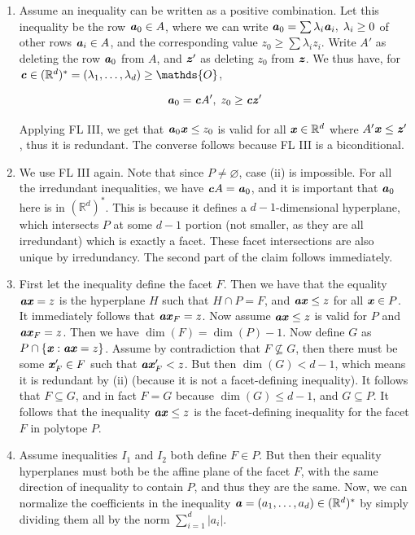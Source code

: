 \documentclass{article}
\begin{document}
\begin{enumerate}
\begin{solution}
\begin{enumerate}[label=(\roman*)]
    \item Assume an inequality can be written as a positive combination. Let this inequality be the row $\textbf{\textit{a}}_0 \in A$, where we can write $\textbf{\textit{a}}_0 = \sum \lambda_i\textbf{\textit{a}}_i, \; \lambda_i \geq 0$ of other rows $\textbf{\textit{a}}_i \in A$, and the corresponding value $z_0 \geq \sum\lambda_i z_i$. Write $A'$ as deleting the row $\textbf{\textit{a}}_0$ from $A$, and $\textbf{\textit{z}}'$ as deleting $z_0$ from $\textbf{\textit{z}}$. We thus have, for $\bi{c} \in (\mathbb{R}^d)^* = (\lambda_1, \ldots, \lambda_d) \geq \mathds{O}$,

    \[\textbf{\textit{a}}_0 = \textbf{\textit{c}}A', \; z_0 \geq \textbf{\textit{cz}}'\]

    Applying FL III, we get that $\textbf{\textit{a}}_0\textbf{\textit{x}} \leq z_0$ is valid for all $\textbf{\textit{x}} \in \mathbb{R}^d$ where $A'\textbf{\textit{x}} \leq \textbf{\textit{z}}'$, thus it is redundant. The converse follows because FL III is a biconditional.

    \item We use FL III again. Note that since $P \neq \varnothing$, case (ii) is impossible. For all the irredundant inequalities, we have $\textbf{\textit{c}}A = \textbf{\textit{a}}_0$, and it is important that $\textbf{\textit{a}}_0$ here is in $(\mathbb{R}^d)^*$. This is because it defines a $d-1$-dimensional hyperplane, which intersects $P$ at some $d-1$ portion (not smaller, as they are all irredundant) which is exactly a facet. These facet intersections are also unique by irredundancy. The second part of the claim follows immediately.

    \item First let the inequality define the facet $F$. Then we have that the equality $\textbf{\textit{ax}}= z$ is the hyperplane $H$ such that $H \cap P = F$, and $\textbf{\textit{ax}} \leq z$ for all $\textbf{\textit{x}} \in P$. It immediately follows that $\textbf{\textit{ax}}_F = z$. Now assume $\textbf{\textit{ax}} \leq z$ is valid for $P$ and $\textbf{\textit{ax}}_F = z$. Then we have $\dim(F) = \dim(P) - 1$. Now define $G$ as $ P \cap \{\textbf{\textit{x}}: \textbf{\textit{ax}} = z\}$. Assume by contradiction that $F \not \subseteq G$, then there must be some $\textbf{\textit{x}}_F' \in F$ such that $\textbf{\textit{ax}}_F' < z$. But then $\dim(G) < d-1$, which means it is redundant by (ii) (because it is not a facet-defining inequality). It follows that $F \subseteq G$, and in fact $F = G$ because $\dim(G) \leq d-1$, and $G \subseteq P$. It follows that the inequality $\textbf{\textit{ax}} \leq z$ is the facet-defining inequality for the facet $F$ in polytope $P$.
    
    \item Assume inequalities $I_1$ and $I_2$ both define $F \in P$. But then their equality hyperplanes must both be the affine plane of the facet $F$, with the same direction of inequality to contain $P$, and thus they are the same. Now, we can normalize the coefficients in the inequality $\textbf{\textit{a}} = (a_1, \ldots, a_d) \in (\mathbb{R}^d)^*$ by simply dividing them all by the norm $\sum_{i=1}^d |a_i|$.
    

\end{enumerate}
\end{solution}
\end{enumerate}
\end{document}
